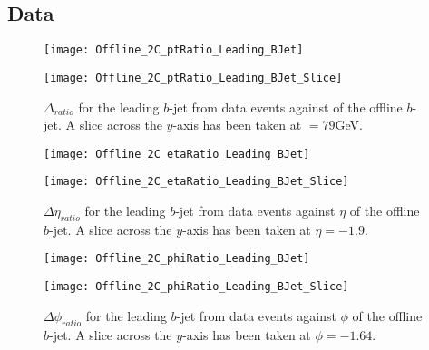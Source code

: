 	\newpage
	\subsection{Data}

		\begin{figure}[h]
			\centering
			\begin{minipage}[h]{0.33\linewidth}
				\texttt{[image: Offline\_2C\_ptRatio\_Leading\_BJet]}
				
			\end{minipage}
			\quad
			\begin{minipage}[h]{0.33\linewidth}
				\texttt{[image: Offline\_2C\_ptRatio\_Leading\_BJet\_Slice]}
			\end{minipage}
			\caption{$\Delta $\pt$_{ratio}$ for the leading \pt $b$-jet from data events against \pt of the offline $b$-jet. A slice across the $y$-axis has been taken at \pt$=79$GeV. }
			\label{fig:D:leadingbpt}
		\end{figure}
		
		\begin{figure}[h]
			\centering
			
			\begin{minipage}[h]{0.33\linewidth}
				\texttt{[image: Offline\_2C\_etaRatio\_Leading\_BJet]}
			\end{minipage}
			\quad
			\begin{minipage}[h]{0.33\linewidth}
				\texttt{[image: Offline\_2C\_etaRatio\_Leading\_BJet\_Slice]}
			\end{minipage}
			\caption{$\Delta \eta_{ratio}$ for the leading \pt $b$-jet from  data events against $\eta$ of the offline $b$-jet. A slice across the $y$-axis has been taken at $\eta=-1.9$. }
			\label{fig:D:leadingbeta}
		\end{figure}
		
		\begin{figure}[h]
			\centering
			
			\begin{minipage}[h]{0.33\linewidth}
				\texttt{[image: Offline\_2C\_phiRatio\_Leading\_BJet]}
			\end{minipage}
			\quad
			\begin{minipage}[h]{0.33\linewidth}
				\texttt{[image: Offline\_2C\_phiRatio\_Leading\_BJet\_Slice]}
			\end{minipage}
			\caption{$\Delta \phi_{ratio}$ for the leading \pt $b$-jet from  data events against $\phi$ of the offline $b$-jet. A slice across the $y$-axis has been taken at $\phi=-1.64$. }
			\label{fig:D:leadingbphi}
		\end{figure}
		
